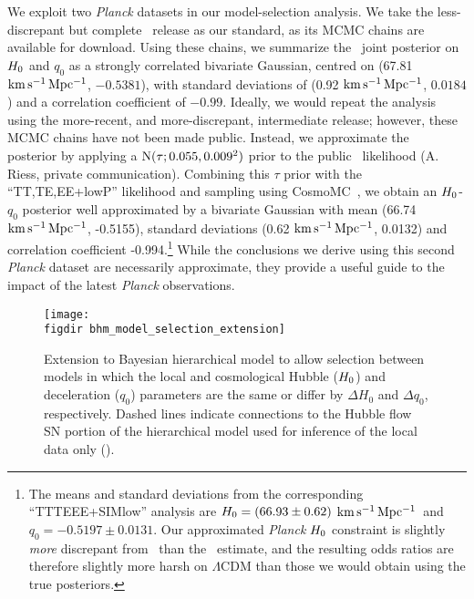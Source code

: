 \documentclass[a4paper,fleqn,usenatbib]{mnras}
\newcommand{\riess}{\citetalias{Riess_etal:2016}}
\newcommand{\decel}{\ensuremath{q_0}}
\newcommand{\kmsmpc}{\ensuremath{{\rm km\,s^{-1}\,Mpc^{-1}}}}
\newcommand{\dhubble}{\ensuremath{\Delta H_0}}
\newcommand{\ddecel}{\ensuremath{\Delta q_0}}
\begin{document}
{We exploit two {\it Planck} datasets in our model-selection analysis. We take the less-discrepant but complete~\citet{Planck_XIII:2016} release as our standard, as its MCMC chains are available for download. Using these chains, we summarize the~\citet{Planck_XIII:2016} joint posterior on $H_0$ and $\decel$ as a strongly correlated bivariate Gaussian, centred on (67.81 \kmsmpc, $-0.5381$), with standard deviations of (0.92 \kmsmpc, $0.0184$) and a correlation coefficient of $-0.99$. Ideally, we would repeat the analysis using the more-recent, and more-discrepant, \citet{Planck_Int_XLVI:2016} intermediate release; however, these MCMC chains have not been made public. Instead, we approximate the~\citet{Planck_Int_XLVI:2016} posterior by applying a ${\rm N}(\tau; 0.055, 0.009^2)$ prior to the public~\citet{Planck_XIII:2016} likelihood (A. Riess, private communication). Combining this $\tau$ prior with the ``TT,TE,EE+lowP'' likelihood and sampling using CosmoMC~\citep{Lewis:2002ah,Lewis:2013hha}, we obtain an $H_0$-$\decel$ posterior well approximated by a bivariate Gaussian with mean (66.74 \kmsmpc, -0.5155), standard deviations (0.62 \kmsmpc, 0.0132) and correlation coefficient -0.994.\footnote{The means and standard deviations from the corresponding~\citet{Planck_Int_XLVI:2016} ``TTTEEE+SIMlow'' analysis are $H_0 = (66.93 \pm 0.62)$ \kmsmpc\ and $\decel = -0.5197 \pm 0.0131$. Our approximated {\it Planck} $H_0$ constraint is slightly {\it more} discrepant from \riess\ than the~\citet{Planck_Int_XLVI:2016} estimate, and the resulting odds ratios are therefore slightly more harsh on $\Lambda$CDM than those we would obtain using the true posteriors.} While the conclusions we derive using this second {\it Planck} dataset are necessarily approximate, they provide a useful guide to the impact of the latest {\it Planck} observations.

\begin{figure}
\texttt{[image: \\figdir bhm\_model\_selection\_extension]}
\caption{Extension to Bayesian hierarchical model to allow selection between models in which the local and cosmological Hubble ($H_0$) and deceleration ($\decel$) parameters are the same or differ by $\dhubble$ and $\ddecel$, respectively. Dashed lines indicate connections to the Hubble flow SN portion of the hierarchical model used for inference of the local data only ().}
\label{figure:network_mod_sel}
\end{figure}

}
\end{document}
